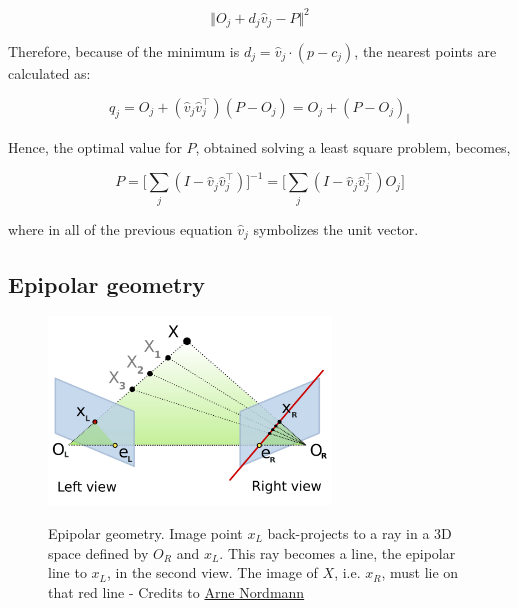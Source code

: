 \begin{equation}
\label{eqn:mindist}
	\Vert O_j + d_j \hat{v}_j - P \Vert^2
\end{equation}

Therefore, because of the minimum is $d_j = \hat{v}_j \cdot (p - c_j)$, the nearest points are calculated as:

\begin{equation}\label{eqn:closestpoint}
	q_j = O_j + (\hat{v}_j \hat{v}_j^\top)(P - O_j) = O_j + (P - O_j)_{\Vert}
\end{equation}

Hence, the optimal value for $P$, obtained solving a least square problem, becomes,

\begin{equation}\label{eqn:solP}
	P = \Big[ \sum_j (I - \hat{v}_j \hat{v}_j^\top ) \Big]^{-1} = \Big[ \sum_j (I - \hat{v}_j \hat{v}_j^\top )O_j \Big]
\end{equation}

where in all of the previous equation $\hat{v}_j$ symbolizes the unit vector.

\subsection{Epipolar geometry}
\label{subsection:epipolar-geometry}

\begin{figure}[t]
	\begin{center}
		{\includegraphics[width=.8\textwidth, height=5cm, keepaspectratio]{images/epipolar-geometry-2}}
\caption{Epipolar geometry. Image point $x_L$ back-projects to a ray in a 3D space defined by $O_R$ and $x_L$. This ray becomes a line, the epipolar line to $x_L$, in the second view. The image of $X$, i.e. $x_R$, must lie on that red line - Credits to \href{https://commons.wikimedia.org/wiki/User:Norro}{Arne Nordmann}}
\label{fig:epipolargeom-2}
	\end{center}
\end{figure}

